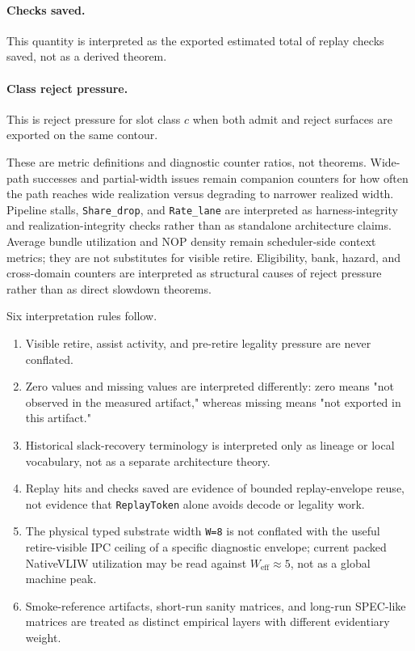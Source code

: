 \documentclass[twocolumn]{article}
\begin{document}
\paragraph{Checks saved.}

This quantity is interpreted as the exported estimated total of replay checks saved, not as a derived theorem.

\paragraph{Class reject pressure.}

This is reject pressure for slot class \(c\) when both admit and reject surfaces are exported on the same contour.

These are metric definitions and diagnostic counter ratios, not theorems. Wide-path successes and partial-width issues remain companion counters for how often the path reaches wide realization versus degrading to narrower realized width. Pipeline stalls, \texttt{Share\_drop}, and \texttt{Rate\_lane} are interpreted as harness-integrity and realization-integrity checks rather than as standalone architecture claims. Average bundle utilization and NOP density remain scheduler-side context metrics; they are not substitutes for visible retire. Eligibility, bank, hazard, and cross-domain counters are interpreted as structural causes of reject pressure rather than as direct slowdown theorems.

Six interpretation rules follow.

\begin{enumerate}
\item Visible retire, assist activity, and pre-retire legality pressure are never conflated.
\item Zero values and missing values are interpreted differently: zero means "not observed in the measured artifact," whereas missing means "not exported in this artifact."
\item Historical slack-recovery terminology is interpreted only as lineage or local vocabulary, not as a separate architecture theory.
\item Replay hits and checks saved are evidence of bounded replay-envelope reuse, not evidence that \texttt{ReplayToken} alone avoids decode or legality work.
\item The physical typed substrate width \texttt{W=8} is not conflated with the useful retire-visible IPC ceiling of a specific diagnostic envelope; current packed NativeVLIW utilization may be read against \(W_{\mathrm{eff}}\approx5\), not as a global machine peak.
\item Smoke-reference artifacts, short-run sanity matrices, and long-run SPEC-like matrices are treated as distinct empirical layers with different evidentiary weight.
\end{enumerate}
\end{document}
